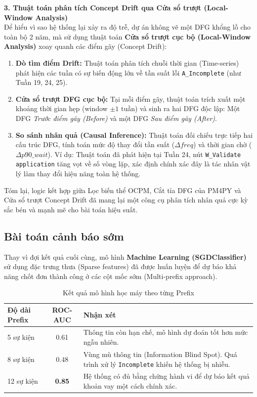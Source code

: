 \documentclass[a4paper,12pt]{article}
\begin{document}
\textbf{3. Thuật toán phân tích Concept Drift qua Cửa sổ trượt (Local-Window Analysis)}\\
Để hiểu vì sao hệ thống lại xảy ra độ trễ, dự án không vẽ một DFG khổng lồ cho toàn bộ 2 năm, mà sử dụng thuật toán \textbf{Cửa sổ trượt cục bộ (Local-Window Analysis)} xoay quanh các điểm gãy (Concept Drift):
\begin{enumerate}
    \item \textbf{Dò tìm điểm Drift:} Thuật toán phân tích chuỗi thời gian (Time-series) phát hiện các tuần có sự biến động lớn về tần suất lỗi \texttt{A\_Incomplete} (như Tuần 19, 24, 25).
    \item \textbf{Cửa sổ trượt DFG cục bộ:} Tại mỗi điểm gãy, thuật toán trích xuất một khoảng thời gian hẹp (window $\pm 1$ tuần) và sinh ra hai DFG độc lập: Một DFG \textit{Trước điểm gãy (Before)} và một DFG \textit{Sau điểm gãy (After)}.
    \item \textbf{So sánh nhân quả (Causal Inference):} Thuật toán đối chiếu trực tiếp hai cấu trúc DFG, tính toán mức độ thay đổi tần suất ($\Delta freq$) và thời gian chờ ($\Delta p90\_wait$). Ví dụ: Thuật toán đã phát hiện tại Tuần 24, nút \texttt{W\_Validate application} tăng vọt về số vòng lặp, xác định chính xác đây là tác nhân vật lý làm thay đổi hiệu năng toàn hệ thống.
\end{enumerate}
Tóm lại, logic kết hợp giữa Lọc biến thể OCPM, Cắt tỉa DFG của PM4PY và Cửa sổ trượt Concept Drift đã mang lại một công cụ phân tích nhân quả cực kỳ sắc bén và mạnh mẽ cho bài toán hiệu suất.

\subsection{Bài toán cảnh báo sớm}
Thay vì đợi kết quả cuối cùng, mô hình \textbf{Machine Learning (SGDClassifier)} sử dụng đặc trưng thưa (Sparse features) đã được huấn luyện để dự báo khả năng chốt đơn thành công ở các cột mốc sớm (Multi-prefix approach).
\begin{table}[H]
\centering
\begin{tabular}{@{}lc p{9cm}@{}}
\toprule
\textbf{Độ dài Prefix} & \textbf{ROC-AUC} & \textbf{Nhận xét} \\ \midrule
5 sự kiện & 0.61 & Thông tin còn hạn chế, mô hình dự đoán tốt hơn mức ngẫu nhiên. \\
8 sự kiện & 0.48 & Vùng mù thông tin (Information Blind Spot). Quá trình xử lý \texttt{Incomplete} khiến hệ thống bị nhiễu. \\
12 sự kiện & \textbf{0.85} & Hệ thống có đủ bằng chứng hành vi để dự báo kết quả khoản vay một cách chính xác. \\ \bottomrule
\end{tabular}
\caption{Kết quả mô hình học máy theo từng Prefix}
\end{table}
\end{document}
